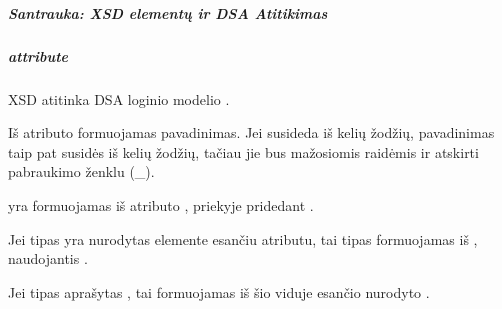 \documentclass[letterpaper,10pt,lithuanian]{sphinxmanual}
\begin{document}
\subparagraph{Santrauka: XSD elementų ir DSA Atitikimas}
\label{\detokenize{schemos/xsd:santrauka-xsd-elementu-ir-dsa-atitikimas}}

\subparagraph{attribute}
\label{\detokenize{schemos/xsd:attribute}}\label{\detokenize{schemos/xsd:xsd-attribute}}
\sphinxAtStartPar
XSD {\hyperref[\detokenize{schemos/xsd:xsd-attribute}]{}} atitinka DSA loginio modelio {\hyperref[\detokenize{formatas:property}]{}}.

\sphinxAtStartPar
Iš {\hyperref[\detokenize{schemos/xsd:xsd-attribute}]{}} atributo  formuojamas {\hyperref[\detokenize{formatas:property}]{}} pavadinimas. Jei 
susideda iš kelių žodžių, {\hyperref[\detokenize{formatas:property}]{}} pavadinimas taip pat susidės iš kelių žodžių,
tačiau jie bus mažosiomis raidėmis ir atskirti pabraukimo ženklu (\_).

\sphinxAtStartPar
{\hyperref[\detokenize{dimensijos:property.source}]{}} yra formuojamas iš {\hyperref[\detokenize{schemos/xsd:xsd-attribute}]{}} atributo , priekyje pridedant .

\sphinxAtStartPar
Jei  tipas yra nurodytas  elemente esančiu {\hyperref[\detokenize{schemos/xsd:xsd-type}]{}} atributu,
tai {\hyperref[\detokenize{formatas:property}]{}} tipas formuojamas iš {\hyperref[\detokenize{schemos/xsd:xsd-attribute}]{}},  naudojantis .

\sphinxAtStartPar
Jei  tipas aprašytas {\hyperref[\detokenize{schemos/xsd:xsd-simpletype}]{}}, tai {\hyperref[\detokenize{dimensijos:property.type}]{}} formuojamas iš šio
 viduje esančio {\hyperref[\detokenize{schemos/xsd:xsd-restriction}]{}} {\hyperref[\detokenize{schemos/xsd:xsd-base}]{}} nurodyto {\hyperref[\detokenize{schemos/xsd:xsd-type}]{}}.
\end{document}
